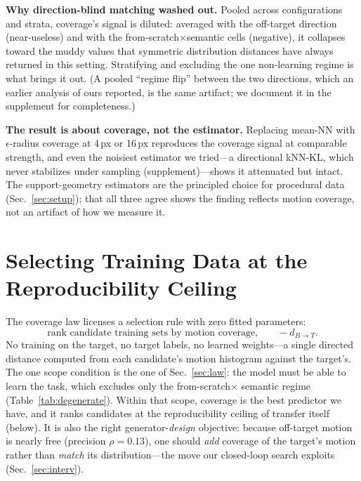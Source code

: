 \documentclass[runningheads]{llncs}
\newcommand{\dbt}{d_{B\to T}}
\begin{document}
\noindent\textbf{Why direction-blind matching washed out.} Pooled across
configurations and strata, coverage's signal is diluted: averaged with the
off-target direction (near-useless) and with the from-scratch$\times$semantic
cells (negative), it collapses toward the muddy values that symmetric
distribution distances have always returned in this setting. Stratifying and
excluding the one non-learning regime is what brings it out. (A pooled
``regime flip'' between the two directions, which an earlier analysis of ours
reported, is the same artifact; we document it in the supplement for
completeness.)

\noindent\textbf{The result is about coverage, not the estimator.} Replacing
mean-NN with $\epsilon$-radius coverage at 4\,px or 16\,px reproduces the
coverage signal at comparable strength, and even the noisiest estimator we
tried---a directional kNN-KL, which never stabilizes under sampling
(supplement)---shows it attenuated but intact. The support-geometry estimators
are the principled choice for procedural data (Sec.~\ref{sec:setup}); that all
three agree shows the finding reflects motion coverage, not an artifact of how
we measure it.

\section{Selecting Training Data at the Reproducibility Ceiling}
\label{sec:predict}

The coverage law licenses a selection rule with zero fitted parameters:
\begin{equation}
\text{rank candidate training sets by motion coverage,}\qquad -\dbt .
\label{eq:rule}
\end{equation}
No training on the target, no target labels, no learned weights---a single
directed distance computed from each candidate's motion histogram against the
target's. The one scope condition is the one of Sec.~\ref{sec:law}: the model
must be able to learn the task, which excludes only the from-scratch$\times$
semantic regime (Table~\ref{tab:degenerate}). Within that scope, coverage is
the best predictor we have, and it ranks candidates at the reproducibility
ceiling of transfer itself (below). It is also the right
generator-\emph{design} objective: because off-target motion is nearly free
(precision $\rho{=}0.13$), one should \emph{add} coverage of the target's
motion rather than \emph{match} its distribution---the move our closed-loop
search exploits (Sec.~\ref{sec:interv}).
\end{document}
